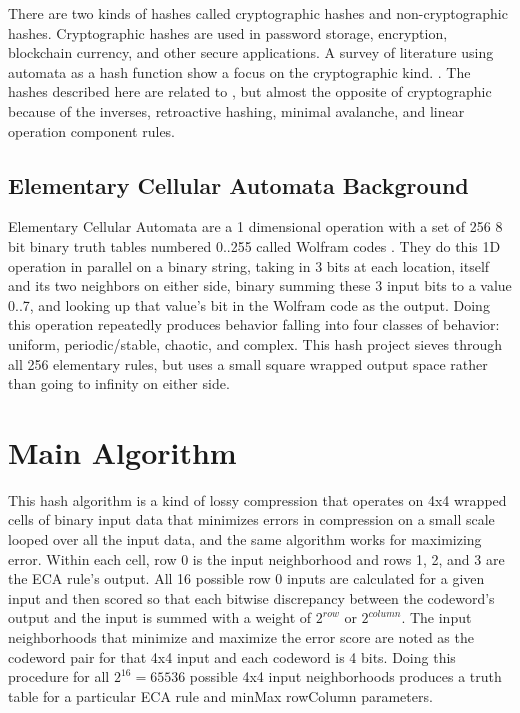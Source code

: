 \documentclass[11pt]{article}
\begin{document}
There are two kinds of hashes called cryptographic hashes and non-cryptographic hashes. Cryptographic hashes are used in password storage, encryption, blockchain currency, and other secure applications. A survey of literature using automata as a hash function show a focus on the cryptographic kind. \cite{app14219719} \cite{article} \cite{Rajeshwaran2019CellularAB} . The hashes described here are related to \cite{fastHash}, but almost the opposite of cryptographic because of the inverses, retroactive hashing, minimal avalanche, and linear operation component rules.\\

\subsection{Elementary Cellular Automata Background}

Elementary Cellular Automata are a 1 dimensional operation with a set of 256 8 bit binary truth tables numbered 0..255 called Wolfram codes \cite{Wolfram}. They do this 1D operation in parallel on a binary string, taking in 3 bits at each location, itself and its two neighbors on either side, binary summing these 3 input bits to a value 0..7, and looking up that value's bit in the Wolfram code as the output. Doing this operation repeatedly produces behavior falling into four classes of behavior: uniform, periodic/stable, chaotic, and complex. This hash project sieves through all 256 elementary rules, but uses a small square wrapped output space rather than going to infinity on either side.

\section{Main Algorithm}
This hash algorithm is a kind of lossy compression that operates on 4x4 wrapped cells of binary input data that minimizes errors in compression on a small scale looped over all the input data, and the same algorithm works for maximizing error. Within each cell, row 0 is the input neighborhood and rows 1, 2, and 3 are the ECA rule's output. All 16 possible row 0 inputs are calculated for a given input and then scored so that each bitwise discrepancy between the codeword's output and the input is summed with a weight of $2^{row}$ or $2^{column}$. The input neighborhoods that minimize and maximize the error score are noted as the codeword pair for that 4x4 input and each codeword is 4 bits. Doing this procedure for all  $2^{16}=65536$ possible 4x4 input neighborhoods produces a truth table for a particular ECA rule and minMax rowColumn parameters.\\
\end{document}
